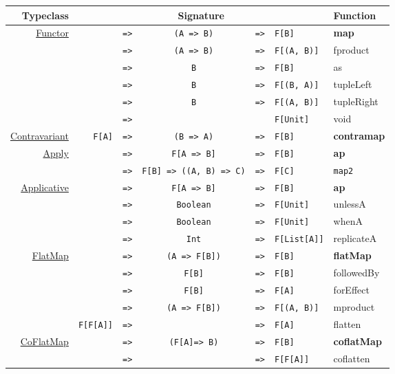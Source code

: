 \documentclass{tufte-handout}
\newcommand{\fa}{F[A]}
\newcommand{\fb}{F[B]}
\newcommand{\rarr}{\texttt{=>}}
\newcommand{\fTwo}[2]{\texttt{#1} & \rarr & & & \texttt{#2}}
\newcommand{\fThree}[3]{\texttt{#1} & \rarr & \texttt{#2} & \rarr & \texttt{#3}}
\newcommand{\sdocUrl}[1]{https://typelevel.org/cats/api/cats/#1.html}
\newcommand{\sdocHref}[1]{\href{\sdocUrl{#1}}{#1}}
\begin{document}
\begin{table}[ht]
  \centering
  \selectfont
  \begin{tabular}{rrcclll}
    Typeclass & \multicolumn{5}{c}{Signature} & Function \\

    \midrule

    \multirow{6}{*}{\sdocHref{Functor}}
      & \fThree{\multirow{6}{*}{\fa}}{(A => B)}{\fb} & \textbf{map} \\
      & \fThree{}{(A => B)}{F[(A, B)]} & fproduct \\
      & \fThree{}{B}{\fb} & as \\
      & \fThree{}{B}{F[(B, A)]} & tupleLeft \\
      & \fThree{}{B}{F[(A, B)]} & tupleRight \\
      & \fTwo{}{F[Unit]} & void \\[.5cm]

    \multirow{1}{*}{\sdocHref{Contravariant}}
      & \fThree{\fa}{(B => A)}{\fb} & \textbf{contramap} \\[.5cm]

    \multirow{2}{*}{\sdocHref{Apply}\footnotemark}
      & \fThree{\multirow{2}{*}{\fa}}{F[A => B]}{\fb} & \textbf{ap} \\
      & \fThree{}{F[B] => ((A, B) => C)}{F[C]} & \texttt{map2} \\[.5cm]

    \multirow{4}{*}{\sdocHref{Applicative}}
      & \fThree{\multirow{4}{*}{\fa}}{F[A => B]}{\fb} & \textbf{ap} \\
      & \fThree{}{Boolean}{F[Unit]} & unlessA \\
      & \fThree{}{Boolean}{F[Unit]} & whenA \\
      & \fThree{}{Int}{F[List[A]]} & replicateA \\[.5cm]

    \multirow{5}{*}{\sdocHref{FlatMap}}
      & \fThree{\multirow{4}{*}{\fa}}{(A => F[B])}{\fb} & \textbf{flatMap} \\
      & \fThree{}{\fb}{\fb} & followedBy \\
      & \fThree{}{\fb}{\fa} & forEffect \\
      & \fThree{}{(A => \fb)}{F[(A, B)]} & mproduct \\
      & \fThree{F[F[A]]}{}{\fa} & flatten \\[.5cm]

    \multirow{2}{*}{\sdocHref{CoFlatMap}}
      & \fThree{\multirow{2}{*}{\fa}}{(\fa => B)}{\fb} & \textbf{coflatMap} \\
      & \fThree{}{}{F[F[A]]} & coflatten \\[.5cm]

  \end{tabular}
\end{table}
\end{document}
